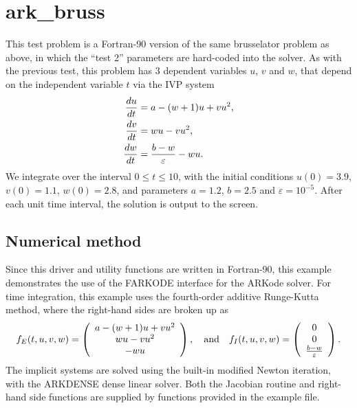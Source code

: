 \documentclass[letterpaper,10pt,english]{sphinxmanual}
\begin{document}
\chapter{ark\_bruss}
\label{ark_bruss::doc}\label{ark_bruss:ark-bruss}\label{ark_bruss:id1}
This test problem is a Fortran-90 version of the same brusselator
problem as above, in which the ``test 2'' parameters are hard-coded into
the solver.  As with the previous test, this problem has 3 dependent
variables $u$, $v$ and $w$, that depend on the
independent variable $t$ via the IVP system
\begin{gather}
\begin{split}\frac{du}{dt} &= a - (w+1)u + v u^2, \\
\frac{dv}{dt} &= w u - v u^2, \\
\frac{dw}{dt} &= \frac{b-w}{\varepsilon} - w u.\end{split}\notag
\end{gather}
We integrate over the interval $0 \le t \le 10$, with the
initial conditions $u(0) = 3.9$, $v(0) = 1.1$, $w(0) = 2.8$,
and parameters $a=1.2$, $b=2.5$ and
$\varepsilon=10^{-5}$.  After each unit time interval, the
solution is output to the screen.


\section{Numerical method}
\label{ark_bruss:numerical-method}
Since this driver and utility functions are written in Fortran-90,
this example demonstrates the use of the FARKODE interface for the
ARKode solver.  For time integration, this example uses the
fourth-order additive Runge-Kutta method, where the right-hand sides
are broken up as
\begin{gather}
\begin{split}f_E(t,u,v,w) = \left(\begin{array}{c} a - (w+1)u + v u^2 \\
  w u - v u^2 \\ - w u  \end{array}\right), \quad\text{and}\quad
f_I(t,u,v,w) = \left(\begin{array}{c} 0\\0\\
  \frac{b-w}{\varepsilon}\end{array}\right).\end{split}\notag
\end{gather}
The implicit systems are solved using the built-in modified Newton
iteration, with the ARKDENSE dense linear solver.  Both the Jacobian
routine and right-hand side functions are supplied by functions
provided in the example file.
\end{document}

